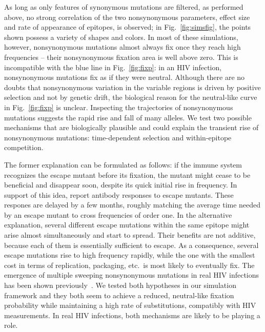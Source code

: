 \documentclass[rmp, twocolumn]{revtex4}
\newcommand{\FIG}[1]{Fig.~\ref{fig:#1}}
\begin{document}
As long as only features of synonymous mutations are filtered, as performed
above, no strong correlation of the two nonsynonymous parameters, effect size
and rate of appearance of epitopes, is observed; in \FIG{simsfig}, the points
shown possess a variety of shapes and colors. In most of these simulations, 
however, nonsynonymous mutations almost always fix once they reach high frequencies
-- their nonsynonymous fixation area is well above zero. This is incompatible
with the blue line in \FIG{fixp}: in an HIV infection, nonsynonymous mutations fix as if they
were neutral. Although there are no doubts that nonsynonymous variation in the
variable regions is driven by positive selection and not by genetic drift, the
biological reason for the neutral-like curve in \FIG{fixp} is unclear.
Inspecting the trajectories of nonsynonymous mutations
suggests the rapid rise and fall of many alleles. We test two possible
mechanisms that are biologically plausible and could explain the transient rise
of nonsynonymous mutations: time-dependent selection and within-epitope
competition.

The former explanation can be formulated as follows: if the immune system
recognizes the escape mutant before its fixation, the mutant might cease to be
beneficial and disappear soon, despite its quick initial rise in frequency. In support of this idea,
\citet{richman_rapid_2003, bunnik_autologous_2008} report antibody responses to
escape mutants. These respones are delayed by a few months, roughly matching the
average time needed by an escape mutant to cross frequencies of order one.
In the alternative explanation, several different escape
mutations within the same epitope might arise almost simultaneously and start to
spread. Their benefits are not additive, because each of them is
essentially sufficient to escape. As a consequence, several escape mutations rise to
high frequency rapidly, while the one with the smallest cost in terms of replication,
packaging, etc.~is most likely to eventually fix. The emergence of
multiple sweeping nonsynonymous mutations in real HIV infections has been shown
previously~\citep{moore_limited_2009, bar_early_2012}.
We tested both hypotheses in our simulation framework and they both seem to
achieve a reduced, neutral-like fixation probability while maintaining a high
rate of substitutions, compatibly with HIV measurements. In real HIV infections,
both mechanisms are likely to be playing a role.
\end{document}
